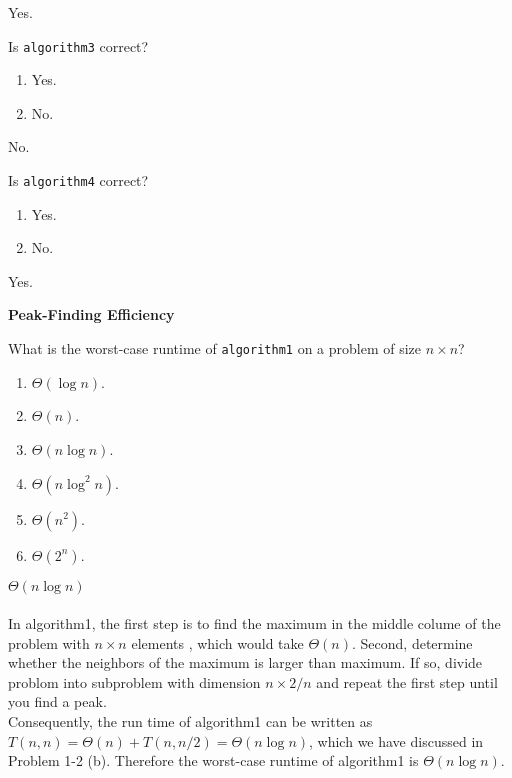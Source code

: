 \documentclass[12pt,twoside]{article}
\begin{document}
\begin{problems}
\begin{problemparts}
\ifsolution \solution{}
Yes.
\fi

\problempart {} Is \texttt{algorithm3} correct?
\begin{enumerate}
\item Yes.
\item No.
\end{enumerate}

\ifsolution \solution{}
No.
\fi

\problempart {} Is \texttt{algorithm4} correct?
\begin{enumerate}
\item Yes.
\item No.
\end{enumerate}

\ifsolution \solution{}
Yes.
\fi

\end{problemparts}

\problem {} \textbf{Peak-Finding Efficiency}

\begin{problemparts}

\problempart {} What is the worst-case runtime of \texttt{algorithm1} on a problem of size $n \times n$?
\begin{enumerate}
\item $\Theta(\log n)$.
\item $\Theta(n)$.
\item $\Theta(n \log n)$.
\item $\Theta(n \log^2 n)$.
\item $\Theta(n^2)$.
\item $\Theta(2^n)$.
\end{enumerate}

\ifsolution \solution{}
$\Theta(n \log n)$
\\
\\
In algorithm1, the first step is to find the maximum in the middle colume of the problem with $n\times n$ elements , 
which would take $\Theta(n)$. Second, determine whether the neighbors of the maximum is larger than maximum. If so, 
divide problom into subproblem with dimension $n\times2/n$ and repeat the first step until you find a peak.
\\
Consequently, the run time of algorithm1 can be written as $T(n, n) = \Theta(n) + T(n,n/2) = \Theta(n\log n)$, 
which we have discussed in Problem 1-2 (b). Therefore the worst-case runtime of algorithm1 is $\Theta(n\log n)$.
\fi


\end{problemparts}
\end{problems}
\end{document}
